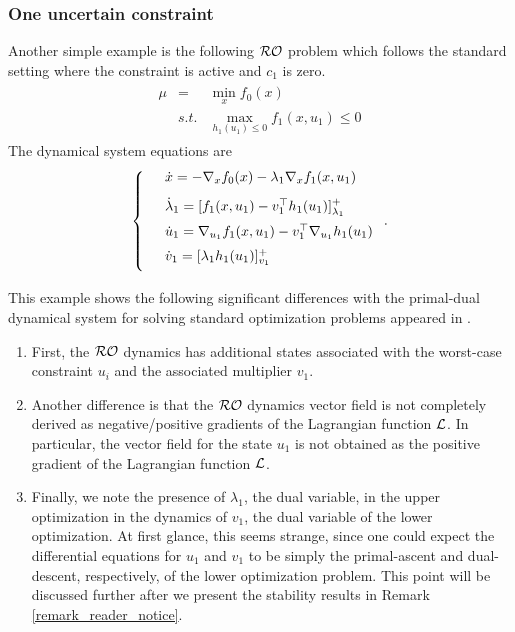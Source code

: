 \documentclass[journal,twoside,web]{ieeecolor}
\begin{document}
\subsubsection{One uncertain constraint}
Another simple example is the following ${\cal RO}$ problem which follows the standard setting where the constraint is active and $c_1$ is zero.
\begin{align*}
\begin{array}{lcl}\mu&=&\displaystyle\min_x f_0(x)\\
&s.t.&\displaystyle \max_{h_1(u_1)\leq 0}f_1(x,u_1)\leq 0
\end{array}
\end{align*}
The dynamical system equations are
\begin{align*}
\left\{
\begin{array}{cl}
\vspace{3mm}
&\dot{x}=-\nabla_x f_0(x)-\lambda_1 \nabla_x f_1(x,u_1)\\
\vspace{2mm}
&\dot{\lambda}_1=[f_1(x,u_1)-v_1^\top h_1(u_1)]_{\lambda_1}^+\\
\vspace{2mm}
&\dot{u}_1=\nabla_{u_1} f_1(x,u_1)-v_1^\top \nabla_{u_1}h_1(u_1)\\
\vspace{2mm}
&\dot{v}_1=[\lambda_1h_1(u_1)]_{v_1}^+
\end{array}\right..
\end{align*}

This example shows the following significant differences with the primal-dual dynamical system for solving standard optimization problems appeared in \cite{feijer2010,cherukuri2016}.
\begin{enumerate}
\item First, the ${\cal RO}$ dynamics has additional states associated with the worst-case constraint $u_i$ and the associated multiplier $v_1$.
 \item Another difference is that the ${\cal RO}$ dynamics vector field is not completely derived as negative/positive gradients of the Lagrangian function ${\cal L}$. In particular, the vector field for the state $u_1$ is not obtained as the positive gradient of the Lagrangian function ${\cal L}$.
\item Finally, we note the presence of $\lambda_1$, the dual variable, in the upper optimization in the dynamics of $v_1$, the dual variable of the lower optimization. At first glance, this seems strange, since one could expect the differential equations for $u_1$ and $v_1$ to be simply the primal-ascent and dual-descent, respectively, of the lower optimization problem. This point will be discussed further after we present the stability results in Remark \ref{remark_reader_notice}.
\end{enumerate}
\end{document}

